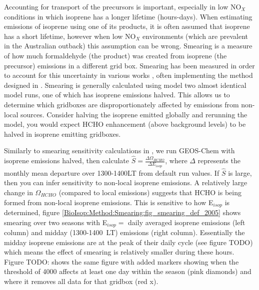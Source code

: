     Accounting for transport of the precursors is important, especially in low NO$_X$ conditions in which isoprene has a longer lifetime (hours-days).
    When estimating emissions of isoprene using one of its products, it is often assumed that isoprene has a short lifetime, however when low NO$_X$ environments (which are prevalent in the Australian outback) this assumption can be wrong.
    Smearing is a measure of how much formaldehyde (the product) was created from isoprene (the precursor) emissions in a different grid box.
    Smearing has been measured in order to account for this uncertainty in various works \parencite[eg.][]{Martin2003,Palmer2003,Millet2006,Marais2012,Barkley2013,Zhu2014,Wolfe2016,Surl2018}, often implementing the method designed in \textcite{Palmer2003}.
    Smearing is generally calculated using model two almost identical model runs, one of which has isoprene emissions halved.
    This allows us to determine which gridboxes are disproportionately affected by emissions from non-local sources.
    Consider halving the isoprene emitted globally and rerunning the model, you would expect HCHO enhancement (above background levels) to be halved in isoprene emitting gridboxes.
    
    Similarly to smearing sensitivity calculations in \textcite{Marais2012}, we run GEOS-Chem with isoprene emissions halved, then calculate $\hat{S} = \frac{\Delta \Omega_{HCHO}}{\Delta E_{isop}} $, where $\Delta$ represents the monthly mean departure over 1300-1400LT from default run values.
    If $\hat{S}$ is large, then you can infer sensitivity to non-local isoprene emissions.
    A relatively large change in $\Omega_{HCHO}$ (compared to local emissions) suggests that HCHO is being formed from non-local isoprene emissions.
    This is sensitive to how E$_{isop}$ is determined, figure \ref{BioIsop:Method:Smearing:fig_smearing_def_2005} shows smearing over two seasons with E$_{isop} =$ daily averaged isoprene emissions (left column) and midday (1300-1400~LT) emissions (right column). 
    Essentially the midday isoprene emissions are at the peak of their daily cycle (see figure TODO) which means the effect of smearing is relatively smaller during these hours.
    Figure TODO: shows the same figure with added markers showing when the threshold of 4000 \parencite[as in][]{Marais2012} affects at least one day within the season (pink diamonds) and where it removes all data for that gridbox (red x).
    
